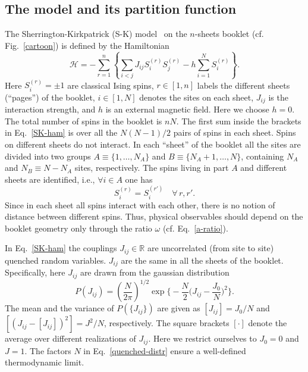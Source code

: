 \documentclass[twocolumn,superscriptaddress,prb,10pt]{revtex4-1}
\begin{document}
\subsection{The model and its partition function}
\label{the-model-def}

The Sherrington-Kirkpatrick (S-K) model~\cite{sherrington-1978-prl,
sherrington-1978} on the $n$-sheets booklet (cf. Fig.~\ref{cartoon}) is 
defined by the Hamiltonian
%
\begin{equation}
{\mathcal H}=-\sum\limits_{r=1}^n\left\{\sum\limits_{i<j}J_{ij}S^{(r)}_i 
S^{(r)}_j-h\sum\limits_{i=1}^NS^{(r)}_i\right\}.
\label{SK-ham}
\end{equation}
%
Here $S_i^{(r)}=\pm 1$ are classical Ising spins, $r\in[1,n]$ labels the 
different sheets (``pages'') of the booklet, $i\in[1,N]$ denotes the sites on 
each sheet, $J_{ij}$ is the interaction strength, and $h$ is an external 
magnetic field. Here we choose $h=0$. The total number of spins in the booklet 
is $nN$. The first sum inside the brackets in Eq.~\eqref{SK-ham} is over all the 
$N(N-1)/2$ pairs of spins in each sheet. Spins on different sheets do not interact. 
In each ``sheet'' of the booklet all the sites are divided into two groups $A\equiv\{1,
\dots, N_A\}$ and $B\equiv\{N_A+1,\dots,N\}$, containing $N_A$ and $N_B\equiv N-N_A$ 
sites, respectively. The spins living in part $A$ and different sheets are identified, 
i.e., $\forall i\in A$ one has  
%
\begin{equation}
S_i^{(r)}=S_{i}^{(r')}\quad\forall\, r,r'. 
\label{book-constraint}
\end{equation}
%
Since in each sheet all spins interact with each other, there is no notion of distance 
between different spins. Thus, physical observables should depend on the booklet geometry 
only through the ratio $\omega$ (cf. Eq.~\eqref{a-ratio}). 

In Eq.~\eqref{SK-ham} the couplings $J_{ij}\in\mathbb{R}$ are uncorrelated (from site to site) 
quenched random variables. $J_{ij}$ are the same in all the sheets of the booklet. Specifically, 
here $J_{ij}$ are drawn from the gaussian distribution   
%
\begin{equation}
P(J_{ij})=
\left(\frac{N}{2\pi}\right)^{1/2}
\exp\Big\{-\frac{N}{2}
\Big(J_{ij}-\frac{J_0}{N}\Big)^2\Big\}.
\label{quenched-distr}
\end{equation}
%
The mean and the variance of $P(\{J_{ij}\})$ are given as $[J_{ij}]=J_0/N$ 
and $[(J_{ij}-[J_{ij}])^2]=J^2/N$, respectively. The square brackets $[\cdot]$ denote 
the average over different realizations of $J_{ij}$.  Here we restrict ourselves to 
$J_0=0$ and $J=1$. The factors $N$ in Eq.~\eqref{quenched-distr} ensure a well-defined 
thermodynamic limit. 
\end{document}
